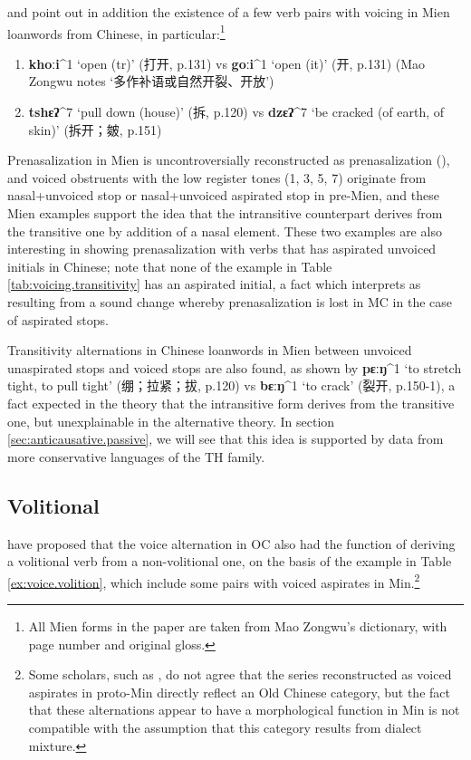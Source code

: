 \documentclass[oneside,a4paper,11pt]{article}
\newcommand{\ipa}[1]{\textbf{{\phon\mbox{#1}}}} %
\newcommand{\zh}[1]{{\cn #1}}
\newcommand{\mien}[5]{\ipa{#1}^{#2} `#3' (\zh{#4}, p.#5)}
\begin{document}
 \citet{downer73loanwords} and \citet{sagart03prenasalized} point out in addition the existence of 
a few verb pairs with voicing in Mien loanwords from Chinese, in particular:\footnote{All Mien forms in the paper are taken from Mao Zongwu's \citeyear{maozw92mien} dictionary, with page number and original gloss.} 

\begin{enumerate}
\item \mien{khoːi}{1}{open (tr)}{打开}{131}  vs \mien{goːi}{1}{open (it)}{开}{131}  (Mao Zongwu notes `\zh{多作补语或自然开裂、开放}')
\item \mien{tshɛʔ}{7}{pull down (house)}{拆}{120} vs \mien{dzɛʔ}{7}{be cracked (of earth, of skin)}{拆开；皴}{151}
\end{enumerate}

Prenasalization in Mien is uncontroversially reconstructed as prenasalization (\citealt{ratliff10protohm}), and voiced obstruents with the low register tones (1, 3, 5, 7) originate from nasal+unvoiced stop or nasal+unvoiced aspirated stop in pre-Mien, and these Mien examples support the idea that the intransitive counterpart derives from the transitive one by addition of a nasal element. These two examples are also interesting in showing prenasalization with verbs that has aspirated unvoiced initials in Chinese; note that none of the example in Table \ref{tab:voicing.transitivity} has an aspirated initial, a fact which \citet{sagart03prenasalized} interprets as resulting from a sound change whereby prenasalization is lost in MC in the case of aspirated stops.

Transitivity alternations in Chinese loanwords in Mien between unvoiced unaspirated stops and voiced stops are also found, as shown by \mien{pɛːŋ}{1}{to stretch tight, to pull tight}{绷；拉紧；拔}{120} vs \mien{bɛːŋ}{1}{to crack}{裂开}{150-1}, a fact expected in the theory that the intransitive form derives from the transitive one, but unexplainable in the alternative theory. In section \ref{sec:anticausative.passive}, we will see that this idea is supported by data from more conservative languages of the TH family.

\subsection{Volitional}
\citet[55;131-5]{bs14oc} have proposed that the voice alternation in OC also had the function of deriving a volitional verb from a non-volitional one, on the basis of the example in Table \ref{ex:voice.volition}, which include some pairs with voiced aspirates in Min.\footnote{Some scholars, such as \citet{handel10min}, do not agree that the series reconstructed as voiced aspirates in proto-Min directly reflect an Old Chinese category, but the fact that these alternations appear to have a morphological function in Min is not compatible with the assumption that this category results from dialect mixture.  }
\end{document}

